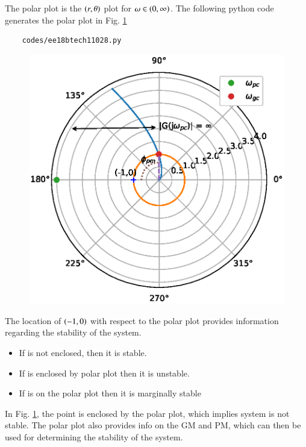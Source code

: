 The polar plot is the $\left(r,\theta\right)$ plot for $\omega \in \left(0,\infty\right)$.
The following python code generates  the polar plot in Fig. \ref{fig:ee18btech11028_fig1}
\begin{lstlisting}
    codes/ee18btech11028.py
\end{lstlisting}
\begin{figure}[!h]
\centering
    \includegraphics[width=\columnwidth]{./figs/ee18btech11028.eps}
  \caption{}
  \label{fig:ee18btech11028_fig1}
\end{figure}
The location of $\left(-1,0\right)$ with respect to the polar plot provides information regarding the stability of the system.  
\begin{itemize}
    
    \item If   is not enclosed, then it is stable.
    \item If  is enclosed by polar plot then it is unstable. 
    \item If  is on the polar plot then it is marginally stable
    
    
\end{itemize}
In Fig. \ref{fig:ee18btech11028_fig1},  the point  is enclosed by the polar plot,
which implies system is not stable.  The polar plot also provides info on the GM and PM, which can then be used for determining the stability of the system.

